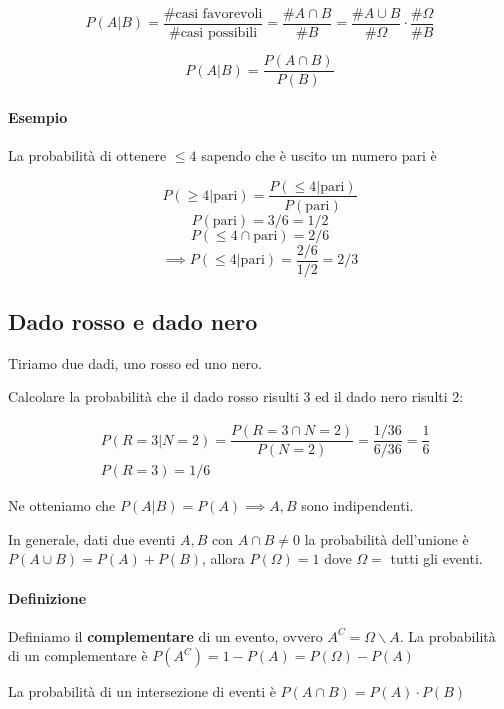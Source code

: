 \[ P(A|B) = \dfrac{\text{\# casi favorevoli}}{\text{\# casi possibili}} = \dfrac{\# A \cap B}{\# B} = \dfrac{\# A \cup B}{\# \Omega} \cdot \dfrac{\# \Omega}{\# B}\]

\[ P(A|B) = \dfrac{P(A \cap B)}{P(B)} \]

\paragraph{Esempio}
La probabilità di ottenere $ \leq 4 $ sapendo che è uscito un numero pari è

\[ P(\geq 4|\text{pari}) = \dfrac{P(\leq 4 | \text{pari})}{P(\text{pari})} \]
\[ P(\text{pari}) = 3/6 = 1/2 \]
\[ P(\leq 4 \cap \text{pari}) = 2/6 \]
\[ \implies P(\leq 4|\text{pari}) = \dfrac{2/6}{1/2} = 2/3 \]  
\subsection{Dado rosso e dado nero}

Tiriamo due dadi, uno rosso ed uno nero.

Calcolare la probabilità che il dado rosso risulti 3 ed il dado nero risulti 2:

\begin{align*}
	& P(R=3 | N=2) = \dfrac{P(R=3 \cap N=2)}{P(N=2)} = \dfrac{1/36}{6/36} = \dfrac{1}{6} \\
	& P(R=3) = 1/6
\end{align*}

Ne otteniamo che $ P(A|B) = P(A) \implies A, B $ sono indipendenti.

In generale, dati due eventi $ A, B $ con $ A \cap B \neq 0 $ la probabilità dell'unione è $ P(A \cup B) = P(A) + P(B) $, allora $ P(\Omega) = 1 $ dove $ \Omega = $ tutti gli eventi.

\paragraph{Definizione} Definiamo il \textbf{complementare} di un evento, ovvero $ A^C=\Omega \backslash A $. La probabilità di un complementare è $ P(A^C) = 1 - P(A) = P(\Omega) - P(A) $

La probabilità di un intersezione di eventi è $ P(A \cap B) = P(A) \cdot P(B) $

\clearpage
